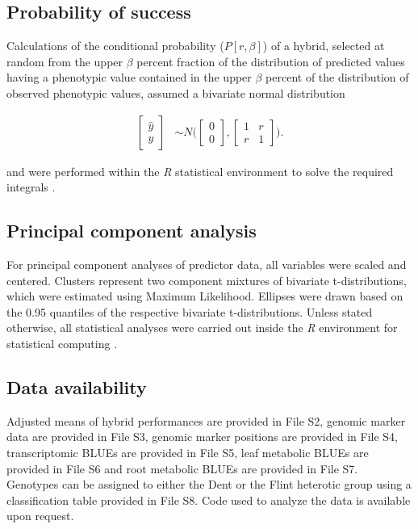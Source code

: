 \documentclass[12pt,titlepage]{article}
\begin{document}
\subsection{Probability of success}
Calculations of the conditional probability ($P[r, \beta]$) of a hybrid, 
selected at random from the upper $\beta$ percent fraction of the distribution 
of predicted values having a phenotypic value contained in the upper $\beta$ 
percent of the distribution of observed phenotypic values, assumed a bivariate
normal distribution

\begin{align}
  \begin{bmatrix}
    \hat{y} \\
    y
   \end{bmatrix}
  & \sim
  N \Bigg(
  \begin{bmatrix}
    0 \\
    0
  \end{bmatrix},
  \begin{bmatrix}
    1 & r \\
    r & 1
  \end{bmatrix}
  \Bigg).
\end{align}

and were performed within the \emph{R} statistical environment to solve the 
required integrals \cite{Robson1967}.



\subsection{Principal component analysis}
For principal component analyses of predictor data, all variables were scaled 
and centered.
Clusters represent two component mixtures of bivariate t-distributions, which
were estimated using Maximum Likelihood.
Ellipses were drawn based on the 0.95 quantiles of the respective bivariate
t-distributions.
Unless stated otherwise, all statistical analyses were carried out inside the 
\emph{R} environment for statistical computing \cite{Team2016}.


\subsection{Data availability}
Adjusted means of hybrid performances are provided in File S2, genomic marker
data are provided in File S3, genomic marker positions are provided in File
S4, transcriptomic BLUEs are provided in File S5, leaf metabolic BLUEs are
provided in File S6 and root metabolic BLUEs are provided in File S7.
Genotypes can be assigned to either the Dent or the Flint heterotic group using
a classification table provided in File S8.
Code used to analyze the data is available upon request.
\end{document}

